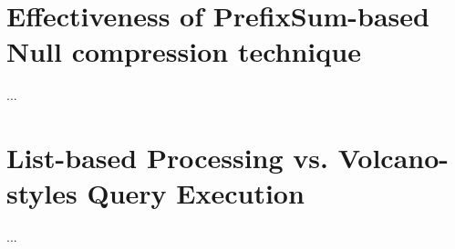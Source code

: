 \section{Effectiveness of PrefixSum-based Null compression technique}
\label{exp:prefixSum}

...

\section{List-based Processing vs. Volcano-styles Query Execution}
\label{exp:list-based}

...
